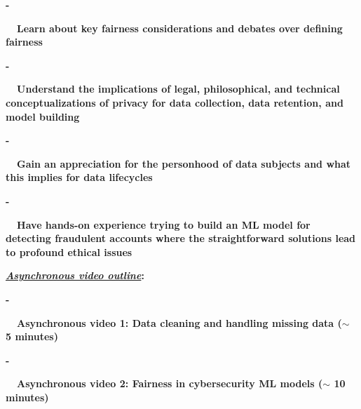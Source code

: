 \documentclass[12pt]{article}
\renewcommand{\_}{\kern-1.5pt\textunderscore\kern-1.5pt}
\begin{document}
\begin{adjustwidth}{0.5in}{0.0in}
\textbf{-}{\fontsize{7pt}{8.4pt}\selectfont \textbf{\ \  \tab Learn about key fairness considerations and debates over defining fairness}\par}\par

\end{adjustwidth}

\begin{adjustwidth}{0.5in}{0.0in}
\textbf{-}{\fontsize{7pt}{8.4pt}\selectfont \textbf{\ \  \tab Understand the implications of legal, philosophical, and technical conceptualizations of privacy for data collection, data retention, and model building}\par}\par

\end{adjustwidth}

\begin{adjustwidth}{0.5in}{0.0in}
\textbf{-}{\fontsize{7pt}{8.4pt}\selectfont \textbf{\ \  \tab Gain an appreciation for the personhood of data subjects and what this implies for data lifecycles}\par}\par

\end{adjustwidth}

\begin{adjustwidth}{0.5in}{0.0in}
\textbf{-}{\fontsize{7pt}{8.4pt}\selectfont \textbf{\ \  \tab Have hands-on experience trying to build an ML model for detecting fraudulent accounts where the straightforward solutions lead to profound ethical issues}\par}\par

\end{adjustwidth}



\textbf{\textit{\uline{Asynchronous video outline}}:}\par

\begin{adjustwidth}{0.5in}{0.0in}
\textbf{-}{\fontsize{7pt}{8.4pt}\selectfont \textbf{\ \  \tab Asynchronous video 1: Data cleaning and handling missing data ($ \sim $ 5 minutes)}\par}\par

\end{adjustwidth}

\begin{adjustwidth}{0.5in}{0.0in}
\textbf{-}{\fontsize{7pt}{8.4pt}\selectfont \textbf{\ \  \tab Asynchronous video 2: Fairness in cybersecurity ML models ($ \sim $ 10 minutes)}\par}\par

\end{adjustwidth}
\end{document}

